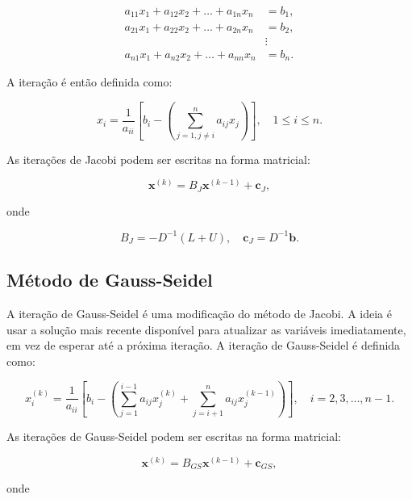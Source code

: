 \documentclass{article}
\theoremstyle{plain}
\theoremstyle{definition}
\theoremstyle{remark}
\begin{document}
\begin{align*}
  a_{11}x_1 + a_{12}x_2 + \ldots + a_{1n}x_n &= b_1, \\
  a_{21}x_1 + a_{22}x_2 + \ldots + a_{2n}x_n &= b_2, \\
  &\vdots \\
  a_{n1}x_1 + a_{n2}x_2 + \ldots + a_{nn}x_n &= b_n.
\end{align*}

A iteração é então definida como:

\begin{equation}
  x_i = \frac{1}{a_{ii}} \left[ b_i - \left(\sum_{j=1, j \neq i}^{n} a_{ij} x_j \right)\right], \quad 1 \leq i \leq n.
\end{equation}

As iterações de Jacobi podem ser escritas na forma matricial:

\begin{equation}
  \mathbf{x}^{(k)} = B_{J}\mathbf{x}^{(k-1)} + \mathbf{c}_{J},
\end{equation}

\noindent onde 

\begin{equation}
  B_{J} = -D^{-1}(L + U), \quad \mathbf{c}_{J} = D^{-1}\mathbf{b}.
\end{equation}

\subsection{Método de Gauss-Seidel}

A iteração de Gauss-Seidel é uma modificação do método de Jacobi. A ideia é usar a solução mais recente disponível para atualizar as variáveis imediatamente, em vez de esperar até a próxima iteração. A iteração de Gauss-Seidel é definida como:

\begin{equation}
  x_i^{(k)} = \frac{1}{a_{ii}} \left[ b_i - \left(\sum_{j=1}^{i-1} a_{ij} x_j^{(k)} + \sum_{j=i+1}^{n} a_{ij} x_j^{(k-1)}\right)\right], \quad i = 2, 3, \ldots, n-1.
\end{equation}

As iterações de Gauss-Seidel podem ser escritas na forma matricial:

\begin{equation}
  \mathbf{x}^{(k)} = B_{GS}\mathbf{x}^{(k-1)} + \mathbf{c}_{GS},
\end{equation}

\noindent onde
\end{document}
